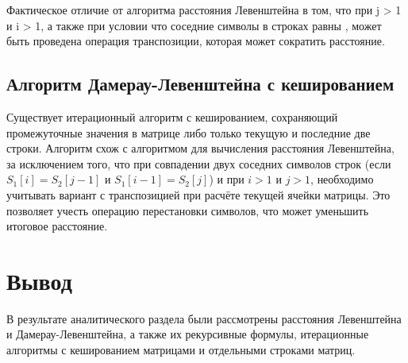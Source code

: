 Фактическое отличие от алгоритма расстояния Левенштейна в том, что при j > 1 и i > 1, а также при условии что соседние символы в строках равны \guillemotright, может быть проведена операция транспозиции, которая может сократить расстояние.

\subsection{Алгоритм Дамерау-Левенштейна с кешированием}
Существует итерационный алгоритм с кешированием, сохраняющий промежуточные значения в матрице либо только текущую и последние две строки. Алгоритм схож с алгоритмом для вычисления расстояния Левенштейна, за исключением того, что при совпадении двух соседних символов строк \guillemotright\space(если $S_1[i] = S_2[j-1]$ и $S_1[i-1] = S_2[j]$) и при $i > 1$ и $j > 1$, необходимо учитывать вариант с транспозицией при расчёте текущей ячейки матрицы. Это позволяет учесть операцию перестановки символов, что может уменьшить итоговое расстояние.\cite{algs}

\section*{Вывод}
В результате аналитического раздела были рассмотрены расстояния Левенштейна и Дамерау-Левенштейна, а также их рекурсивные формулы, итерационные алгоритмы с кешированием матрицами и отдельными строками матриц.

\clearpage